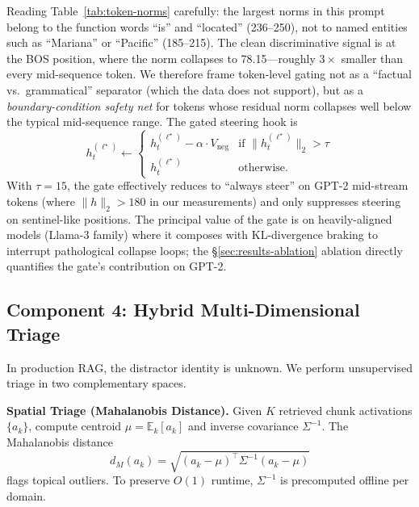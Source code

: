 \documentclass[conference]{IEEEtran}
\begin{document}
Reading Table~\ref{tab:token-norms} carefully: the largest norms in this prompt belong to the function words ``is'' and ``located'' (236--250), not to named entities such as ``Mariana'' or ``Pacific'' (185--215). The clean discriminative signal is at the BOS position, where the norm collapses to 78.15---roughly $3\times$ smaller than every mid-sequence token. We therefore frame token-level gating not as a ``factual vs.\ grammatical'' separator (which the data does not support), but as a \emph{boundary-condition safety net} for tokens whose residual norm collapses well below the typical mid-sequence range. The gated steering hook is
\begin{equation}
    h^{(\ell^\star)}_t \leftarrow
    \begin{cases}
        h^{(\ell^\star)}_t - \alpha \cdot V_{\text{neg}} & \text{if } \|h^{(\ell^\star)}_t\|_2 > \tau \\
        h^{(\ell^\star)}_t & \text{otherwise.}
    \end{cases}
    \label{eq:gating}
\end{equation}
With $\tau = 15$, the gate effectively reduces to ``always steer'' on GPT-2 mid-stream tokens (where $\|h\|_2 > 180$ in our measurements) and only suppresses steering on sentinel-like positions. The principal value of the gate is on heavily-aligned models (Llama-3 family) where it composes with KL-divergence braking to interrupt pathological collapse loops; the §\ref{sec:results-ablation} ablation directly quantifies the gate's contribution on GPT-2.

\subsection{Component 4: Hybrid Multi-Dimensional Triage}\label{sec:method-component4}

In production RAG, the distractor identity is unknown. We perform unsupervised triage in two complementary spaces.

\textbf{Spatial Triage (Mahalanobis Distance).} Given $K$ retrieved chunk activations $\{a_k\}$, compute centroid $\mu = \mathbb{E}_k[a_k]$ and inverse covariance $\Sigma^{-1}$. The Mahalanobis distance
\begin{equation}
    d_M(a_k) = \sqrt{(a_k - \mu)^\top \Sigma^{-1} (a_k - \mu)}
    \label{eq:mahalanobis}
\end{equation}
flags topical outliers. To preserve $O(1)$ runtime, $\Sigma^{-1}$ is precomputed offline per domain.
\end{document}
